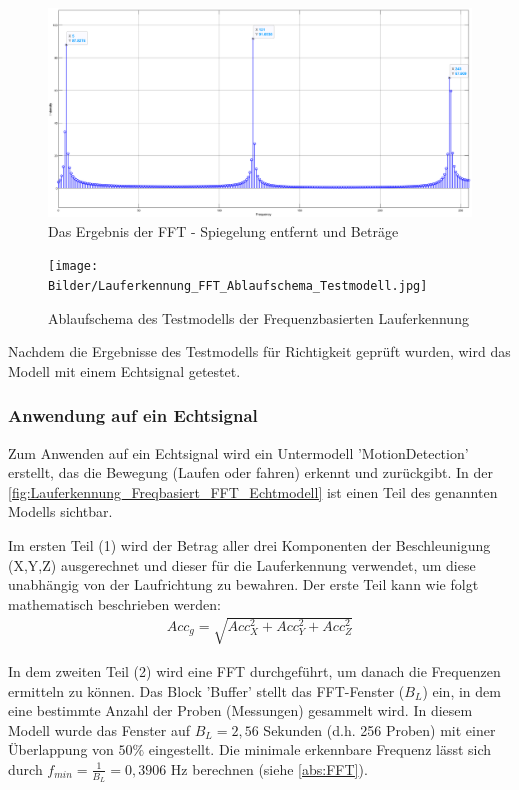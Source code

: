\begin{figure}[H]
	\centering
	\includegraphics[width=\linewidth]{Bilder/FFT_Ergebnis_Skala_512.png}
	\caption{Das Ergebnis der FFT - Spiegelung entfernt und Beträge}
	\label{fig:FFT_Ergebnis_Skala_512}
\end{figure}

\begin{figure}[H]
	\centering
	\texttt{[image: Bilder/Lauferkennung\_FFT\_Ablaufschema\_Testmodell.jpg]}
	\caption{Ablaufschema des Testmodells der Frequenzbasierten Lauferkennung}
	\label{fig:Lauferkennung_FFT_Ablaufschema_Testmodell}
\end{figure}

Nachdem die Ergebnisse des Testmodells für Richtigkeit geprüft wurden, wird das Modell mit einem Echtsignal getestet. 

\subsubsection{Anwendung auf ein Echtsignal}

Zum Anwenden auf ein Echtsignal wird ein Untermodell 'MotionDetection' erstellt, das die Bewegung (Laufen oder fahren) erkennt und zurückgibt.
In der \autoref{fig:Lauferkennung_Freqbasiert_FFT_Echtmodell} ist einen Teil des genannten Modells sichtbar. 

Im ersten Teil (1) wird der Betrag aller drei Komponenten der Beschleunigung (X,Y,Z) ausgerechnet und dieser für die Lauferkennung verwendet, um diese unabhängig von der Laufrichtung zu bewahren. Der erste Teil kann wie folgt mathematisch beschrieben werden:
\begin{align*}
	Acc_g = \sqrt{ Acc_X^2 + Acc_Y^2 + Acc_Z^2}
\end{align*}

In dem zweiten Teil (2) wird eine FFT durchgeführt, um danach die Frequenzen ermitteln zu können. Das Block 'Buffer' stellt das FFT-Fenster ($B_L$) ein, in dem eine bestimmte Anzahl der Proben (Messungen) gesammelt wird. In diesem Modell wurde das Fenster auf $B_L = 2,56$ Sekunden (d.h. 256 Proben) mit einer Überlappung von $50\%$ eingestellt. Die minimale erkennbare Frequenz lässt sich durch $f_{min} = \frac{1}{B_L} = 0,3906$ Hz berechnen (siehe \autoref{abs:FFT}).

